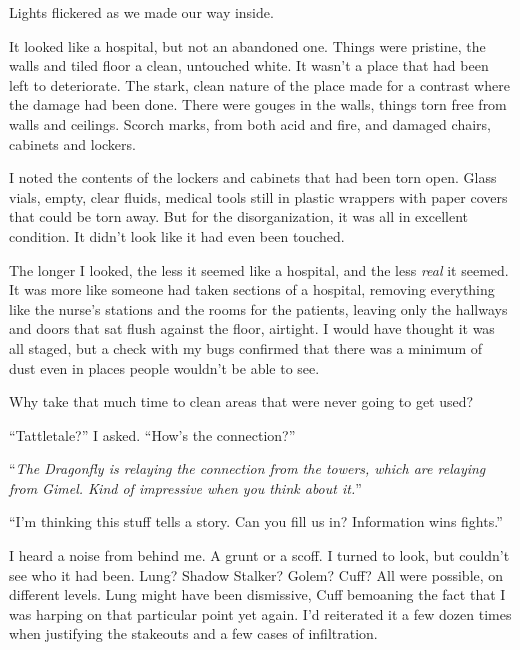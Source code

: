 





Lights flickered as we made our way inside.



It looked like a hospital, but not an abandoned one.  Things were pristine, the walls and tiled floor a clean, untouched white.  It wasn't a place that had been left to deteriorate.  The stark, clean nature of the place made for a contrast where the damage had been done.  There were gouges in the walls, things torn free from walls and ceilings.  Scorch marks, from both acid and fire, and damaged chairs, cabinets and lockers.



I noted the contents of the lockers and cabinets that had been torn open.  Glass vials, empty, clear fluids, medical tools still in plastic wrappers with paper covers that could be torn away.  But for the disorganization, it was all in excellent condition.  It didn't look like it had even been touched.



The longer I looked, the less it seemed like a hospital, and the less \emph{real} it seemed.  It was more like someone had taken sections of a hospital, removing everything like the nurse's stations and the rooms for the patients, leaving only the hallways and doors that sat flush against the floor, airtight.  I would have thought it was all staged, but a check with my bugs confirmed that there was a minimum of dust even in places people wouldn't be able to see.



Why take that much time to clean areas that were never going to get used?



``Tattletale?'' I asked. ``How's the connection?''



``\emph{The Dragonfly is relaying the connection from the towers, which are relaying from Gimel.  Kind of impressive when you think about it.}''



``I'm thinking this stuff tells a story.  Can you fill us in?  Information wins fights.''



I heard a noise from behind me.  A grunt or a scoff.  I turned to look, but couldn't see who it had been.  Lung?  Shadow Stalker?  Golem?  Cuff?  All were possible, on different levels.  Lung might have been dismissive, Cuff bemoaning the fact that I was harping on that particular point yet again.  I'd reiterated it a few dozen times when justifying the stakeouts and a few cases of infiltration.



